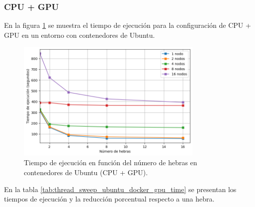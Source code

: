 \subsubsection{CPU + GPU}

En la figura \ref{fig:thread_sweep_ubuntu_docker_gpu_time} se muestra el tiempo de ejecución para la configuración de CPU + GPU en un entorno con contenedores de Ubuntu.

\begin{figure}[H]
    \centering
    \includegraphics[width=0.8\textwidth]{imagenes/cap5/thread_sweep_ubuntu_docker_gpu_time.png}
    \caption{Tiempo de ejecución en función del número de hebras en contenedores de Ubuntu (CPU + GPU).}
    \label{fig:thread_sweep_ubuntu_docker_gpu_time}
\end{figure}

En la tabla \ref{tab:thread_sweep_ubuntu_docker_gpu_time} se presentan los tiempos de ejecución y la reducción porcentual respecto a una hebra.

